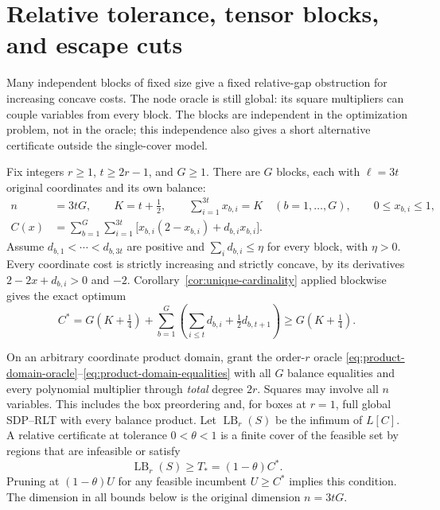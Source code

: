 \section{Relative tolerance, tensor blocks, and escape cuts}
\label{sec:relative-blocks}
Many independent blocks of fixed size give a fixed relative-gap
obstruction for increasing concave costs. The node oracle is still
global: its square multipliers can couple variables from every block.
The blocks are independent in the optimization problem, not in the
oracle; this independence also gives a short alternative certificate
outside the single-cover model.

Fix integers $r\ge1$, $t\ge2r-1$, and $G\ge1$. There are $G$ blocks,
each with $\ell=3t$ original coordinates and its own balance:
\begin{equation}\label{eq:relative-problem}
 \begin{split}
 n&=3tG,\qquad K=t+\tfrac12,\qquad
 \sum_{i=1}^{3t}x_{b,i}=K\quad(b=1,\ldots,G),\qquad 0\le x_{b,i}\le1,\\
 C(x)&=\sum_{b=1}^G\sum_{i=1}^{3t}
       \bigl[x_{b,i}(2-x_{b,i})+d_{b,i}x_{b,i}\bigr].
 \end{split}
\end{equation}
Assume $d_{b,1}<\cdots<d_{b,3t}$ are positive and
$\sum_i d_{b,i}\le\eta$ for every block, with $\eta>0$.
Every coordinate cost is strictly increasing and strictly concave, by
its derivatives $2-2x+d_{b,i}>0$ and $-2$.
Corollary~\ref{cor:unique-cardinality} applied blockwise gives the exact
optimum
\begin{equation}\label{eq:relative-optimum}
 C^*=G(K+\tfrac14)+
       \sum_{b=1}^G\left(\sum_{i\le t}d_{b,i}+\tfrac12d_{b,t+1}\right)
 \ge G(K+\tfrac14).
\end{equation}

On an arbitrary coordinate product domain, grant the order-$r$ oracle
\eqref{eq:product-domain-oracle}--\eqref{eq:product-domain-equalities}
with all $G$ balance equalities and every polynomial multiplier through
\emph{total} degree $2r$. Squares may involve all $n$ variables. This
includes the box preordering and, for boxes at $r=1$, full global
SDP--RLT with every balance product. Let $\operatorname{LB}_r(S)$ be
the infimum of $L[C]$. A relative certificate at tolerance
$0<\theta<1$ is a finite cover of the feasible set by regions that are
infeasible or satisfy
\begin{equation}\label{eq:relative-target}
 \operatorname{LB}_r(S)\ge T_*=(1-\theta)C^*.
\end{equation}
Pruning at $(1-\theta)U$ for any feasible incumbent $U\ge C^*$ implies
this condition. The dimension in all bounds below is the original
dimension $n=3tG$.

